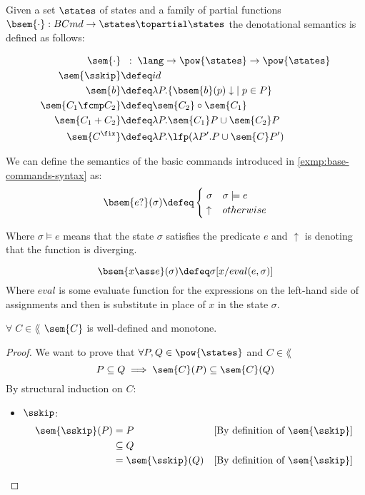 \begin{definition}
  \label{def:deno}
  Given a set $\states$ of states and a family of partial functions
  $\bsem{\cdot} : BCmd \to \states \topartial \states$ the denotational
  semantics is defined as follows:

  \begin{align*}
      \sem{\cdot}         & \;\;:\; \lang \to \pow{\states} \to \pow{\states} \\
      \sem{\sskip}        &\defeq id \\
      \sem{b}             &\defeq \lambda P . \{ \bsem{b}(p)\downarrow \; \mid 
        p \in P \} \\
      \sem{C_1 \fcmp C_2} &\defeq \sem{C_2} \circ \sem{C_1} \\
      \sem{C_1 + C_2}     &\defeq \lambda P . \sem{C_1} P \cup \sem{C_2} P \\
      \sem{C^\fix}        &\defeq \lambda P . \lfp(\lambda P'. P \cup \sem{C} P')
  \end{align*}

  \begin{example}
    We can define the semantics of the basic commands introduced in 
    \ref{exmp:base-commands-syntax} as:
    $$\bsem{e ?}(\sigma) \defeq \begin{cases}
      \; \sigma & \sigma \models e \\
      \; \uparrow & otherwise
    \end{cases}$$

    Where $\sigma \models e$ means that the state $\sigma$ satisfies the 
    predicate $e$ and $\uparrow$ is denoting that the function is diverging.

    $$\bsem{x \ass e}(\sigma) \defeq \sigma[x/eval(e, \sigma)]$$
    Where $eval$ is some evaluate function for the expressions on the left-hand
    side of assignments and then is substitute in place of $x$ in the 
    state $\sigma$.
  \end{example}

  \begin{theorem}[Monotonicity]
    \label{thm:sem-mono}
    $\forall \; C \in \lang$ $\sem{C}$ is well-defined and monotone.
  \end{theorem}
  \begin{proof}
    We want to prove that $\forall P, Q \in \pow{\states}$ and $C \in \lang$
    $$P \subseteq Q \implies \sem{C}(P) \subseteq \sem{C}(Q)$$
    By structural induction on $C$:
    \begin{itemize}
      \item $\sskip$:
        \begin{align*}
          \sem{\sskip}(P) 
            &= P
            & \text{[By definition of $\sem{\sskip}$]}\\
            &\subseteq Q \\
            &= \sem{\sskip}(Q) 
            & \text{[By definition of $\sem{\sskip}$]}\\
        \end{align*}


\end{itemize}
\end{proof}
\end{definition}
